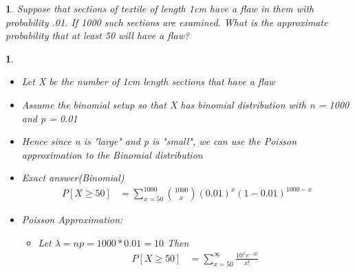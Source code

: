 \documentclass[11pt]{article}
\newtheorem*{solution}{\framebox{Sol}}
\newtheorem{example}{\framebox{Ex}}[section]
\newcommand\tab[1][1cm]{\hspace*{#1}}
\begin{document}
            \begin{example}
                Suppose that sections of textile of length 1cm have a flaw in them with probability .01. 
                If 1000 such sections are examined. What is the approximate probability that at least 50 will have a flaw?
            \end{example}
            \begin{solution} \tab
                \begin{itemize}
                    \item Let X be the number of 1cm length sections that have a flaw
                    \item Assume the binomial setup so that X has binomial distribution with n = 1000 and p = 0.01
                    \item Hence since n is "large" and p is "small", we can use the Poisson approximation to the Binomial distribution
                    \item Exact answer(Binomial)
                        \begin{align*}
                            P[X \geq 50]    &= \sum_{x=50}^{1000} \binom{1000}{x} (0.01)^x(1-0.01)^{1000-x}
                        \end{align*}
                    \item Poisson Approximation: 
                        \begin{itemize}
                            \item Let $\lambda = np = 1000*0.01 = 10$ Then 
                            \begin{align*}
                                P[X \geq 50]    &= \sum_{x=50}^{\infty} \frac{10^xe^{-10}}{x!} \\
                            \end{align*}
                        \end{itemize}
                \end{itemize}
            \end{solution}
\end{document}

